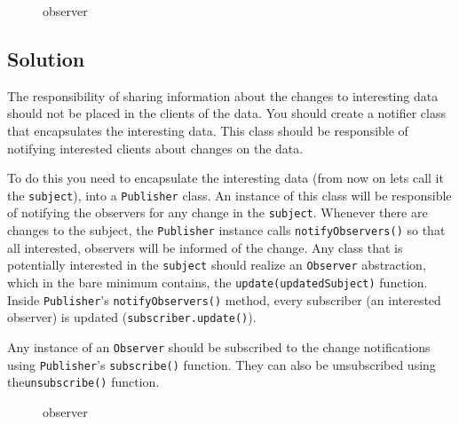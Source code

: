 \begin{figure}
\centering
{}
\caption{observer}
\end{figure}

\subsection{Solution}\label{behavioral-patterns.md__solution-3}

The responsibility of sharing information about the changes to
interesting data should not be placed in the clients of the data. You
should create a notifier class that encapsulates the interesting data.
This class should be responsible of notifying interested clients about
changes on the data.

To do this you need to encapsulate the interesting data (from now on
lets call it the \texttt{subject}), into a \texttt{Publisher} class. An
instance of this class will be responsible of notifying the observers
for any change in the \texttt{subject}. Whenever there are changes to
the subject, the \texttt{Publisher} instance calls
\texttt{notifyObservers()} so that all interested, observers will be
informed of the change. Any class that is potentially interested in the
\texttt{subject} should realize an \texttt{Observer} abstraction, which
in the bare minimum contains, the \texttt{update(updatedSubject)}
function. Inside \texttt{Publisher}'s \texttt{notifyObservers()} method,
every subscriber (an interested observer) is updated
(\texttt{subscriber.update()}).

Any instance of an \texttt{Observer} should be subscribed to the change
notifications using \texttt{Publisher}'s \texttt{subscribe()} function.
They can also be unsubscribed using the\texttt{unsubscribe()} function.

\begin{figure}
\centering
{}
\caption{observer}
\end{figure}

